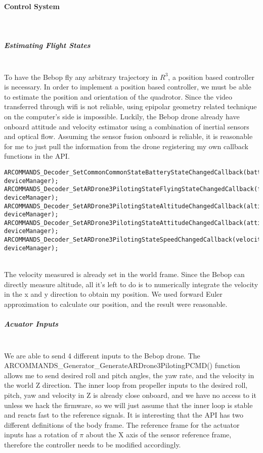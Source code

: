\documentclass{article}
\begin{document}
\paragraph{Control System}\\
\subparagraph{Estimating Flight States}\\

To have the Bebop fly any arbitrary trajectory in $R^3$, a position based controller is necessary. In order to implement a position based controller, we must be able to estimate the position and orientation of the quadrotor. Since the video transferred through wifi is not reliable, using epipolar geometry related technique on the computer's side is impossible. Luckily, the Bebop drone already have onboard attitude and velocity estimator using a combination of inertial sensors and optical flow. Assuming the sensor fusion onboard is reliable, it is reasonable for me to just pull the information from the drone registering my own callback functions in the API. \\

\begin{lstlisting}
ARCOMMANDS_Decoder_SetCommonCommonStateBatteryStateChangedCallback(batteryStateChangedCallback, deviceManager);
ARCOMMANDS_Decoder_SetARDrone3PilotingStateFlyingStateChangedCallback(flyingStateChangedCallback, deviceManager);
ARCOMMANDS_Decoder_SetARDrone3PilotingStateAltitudeChangedCallback(altitudeCallback, deviceManager);
ARCOMMANDS_Decoder_SetARDrone3PilotingStateAttitudeChangedCallback(attitudeCallback, deviceManager);
ARCOMMANDS_Decoder_SetARDrone3PilotingStateSpeedChangedCallback(velocityCallback, deviceManager);
\end{lstlisting}
\\
The velocity measured is already set in the world frame. Since the Bebop can directly measure altitude, all it's left to do is to numerically integrate the velocity in the x and y direction to obtain my position. We used forward Euler approximation to calculate our position, and the result were reasonable. \\

\subparagraph{Acuator Inputs}\\
We are able to send 4 different inputs to the Bebop drone. The ARCOMMANDS_Generator_GenerateARDrone3PilotingPCMD() function allows me to send desired roll and pitch angles, the yaw rate, and the velocity in the world Z direction. The inner loop from propeller inputs to the desired roll, pitch, yaw and velocity in Z is already close onboard, and we have no access to it unless we hack the firmware, so we will just assume that the inner loop is stable and reacts fast to the reference signals. It is interesting that the API has two different definitions of the body frame. The reference frame for the actuator inputs has a rotation of $\pi$ about the X axis of the sensor reference frame, therefore the controller needs to be modified accordingly.\\
\end{document}
